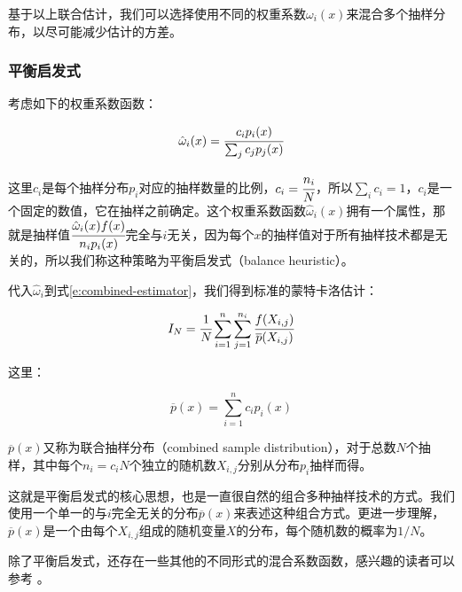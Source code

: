 \noindent 基于以上联合估计，我们可以选择使用不同的权重系数$\omega_i(x)$来混合多个抽样分布，以尽可能减少估计的方差。




\subsubsection{平衡启发式}\label{sec:mc-balance-heuristic}
考虑如下的权重系数函数：

\begin{equation}
	\hat{\omega}_i(x)= \cfrac{c_ip_i(x)}{\sum_j c_jp_j(x)}
\end{equation}

\noindent 这里$c_i$是每个抽样分布$p_i$对应的抽样数量的比例，$c_i= \cfrac{n_i}{N}$，所以$\sum_i c_i=1$，$c_i$是一个固定的数值，它在抽样之前确定。这个权重系数函数$\hat{\omega}_i(x)$拥有一个属性，那就是抽样值$ \cfrac{\hat{\omega}_i(x)f(x)}{n_ip_i(x)}$完全与$i$无关，因为每个$x$的抽样值对于所有抽样技术都是无关的，所以我们称这种策略为平衡启发式（balance heuristic）。

代入$\hat{\omega}_i$到式\ref{e:combined-estimator}，我们得到标准的蒙特卡洛估计：

\begin{equation}
	I_N= \cfrac{1}{N}\sum_{i=1}^{n}\sum_{j=1}^{n_i} \cfrac{f(X_{i,j})}{\overline{p}(X_{i,j})}
\end{equation} 

\noindent 这里：

\begin{equation}
	\overline{p}(x)=\sum_{i=1}^{n}c_ip_i(x)
\end{equation}

\noindent $\overline{p}(x)$又称为联合抽样分布（combined sample distribution），对于总数$N$个抽样，其中每个$n_i=c_i N$个独立的随机数$X_{i,j}$分别从分布$p_i$抽样而得。

这就是平衡启发式的核心思想，也是一直很自然的组合多种抽样技术的方式。我们使用一个单一的与$i$完全无关的分布$\overline{p}(x)$来表述这种组合方式。更进一步理解，$\overline{p}(x)$是一个由每个$X_{i,j}$组成的随机变量$X$的分布，每个随机数的概率为$1/N$。

除了平衡启发式，还存在一些其他的不同形式的混合系数函数，感兴趣的读者可以参考 \cite{a:Safeandeffectiveimportancesampling,a:AdaptiveMultipleImportanceSampling,a:ANADAPTIVEPOPULATIONIMPORTANCESAMPLER,a:EfficientMultipleImportanceSamplingEstimators}。





